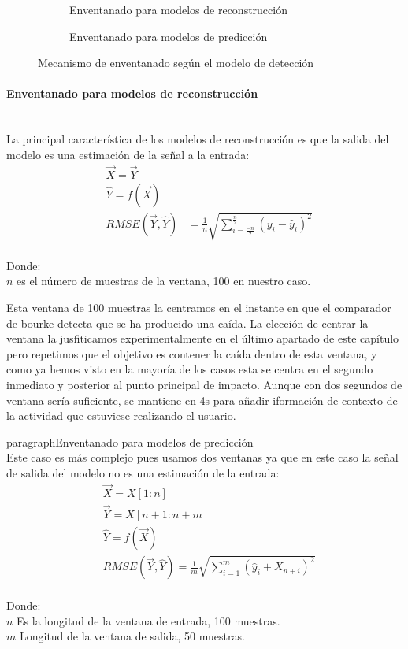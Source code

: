 \begin{figure}[hbt!]
  \centering
  \begin{subfigure}[b]{0.48\textwidth}
    \caption{\label{fig:ifell:detect:window} Enventanado para modelos de reconstrucción}
  \end{subfigure}
  \hfill
  \begin{subfigure}[b]{0.48\textwidth}
    \caption{\label{fig:ifell:predict:window} Enventanado para modelos de predicción}
  \end{subfigure}
  \caption{\label{fig:ifell:windowing} Mecanismo de enventanado según el modelo de detección}
\end{figure}

\paragraph{Enventanado para modelos de reconstrucción}\\
La principal característica de los modelos de reconstrucción es que la salida del modelo es una estimación de la señal a la entrada:
\[
\begin{align*}
  & \vec{X} = \vec{Y}\\
  & \hat{Y} = f(\vec{X})\\
  & RMSE(\vec{Y},\hat{Y}) &= \frac{1}{n}\sqrt{\sum_{i=\frac{-n}{2}}^\frac{n}{2}(y_i-\hat{y}_i)^2 }
\end{align*}
\]\\
Donde:\\
$n$ es el número de muestras de la ventana, 100 en nuestro caso.

Esta ventana de 100 muestras la centramos en el instante en que el comparador de bourke detecta que se ha producido una caída. La elección de centrar la ventana la jusfiticamos experimentalmente en el último apartado de este capítulo pero repetimos que el objetivo es contener  la caída dentro de esta ventana, y como ya hemos visto en la mayoría de los casos esta se centra en el segundo inmediato y posterior al punto principal de impacto. Aunque con dos segundos de ventana sería suficiente, se mantiene en 4s para añadir iformación de contexto de la actividad que estuviese realizando el usuario.  

paragraph{Enventanado para modelos de predicción}\\
Este caso es más complejo pues usamos dos ventanas ya que en este caso la señal de salida del modelo no es una estimación de la entrada:
\[
  \begin{align*}
    &\vec{X} = X[1:n] \\
    &\vec{Y} = X[n+1:n+m] \\
    &\hat{Y} = f(\vec{X})\\
    &RMSE(\vec{Y},\hat{Y})=\frac{1}{m}\sqrt{\sum_{i=1}^m(\hat{y}_i+X_{n+i})^2 }
  \end{align*}
\]\\
Donde:\\
$n$ Es la longitud de la ventana de entrada, 100 muestras.\\
$m$ Longitud de la ventana de salida, 50 muestras.

